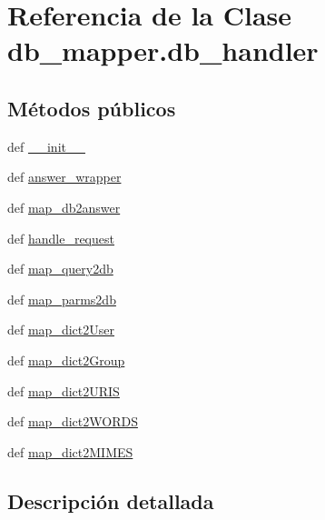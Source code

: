 \hypertarget{classdb__mapper_1_1db__handler}{\section{Referencia de la Clase db\-\_\-mapper.\-db\-\_\-handler}
\label{classdb__mapper_1_1db__handler}
}
\subsection*{Métodos públicos}
\begin{DoxyCompactItemize}
\item 
def \hyperlink{classdb__mapper_1_1db__handler_a479a5e4baa7d3a4a0c086b5f20b19886}{\-\_\-\-\_\-init\-\_\-\-\_\-}
\item 
def \hyperlink{classdb__mapper_1_1db__handler_a5fcc6f04805b1668cfdd37a56b96e481}{answer\-\_\-wrapper}
\item 
def \hyperlink{classdb__mapper_1_1db__handler_a4d3b0376c65e8fafd85e7ebd66c9b268}{map\-\_\-db2answer}
\item 
def \hyperlink{classdb__mapper_1_1db__handler_adebfe1a956d4058883ce07bdaf253365}{handle\-\_\-request}
\item 
def \hyperlink{classdb__mapper_1_1db__handler_acab02d962db6d8b42cdeae79bf46425d}{map\-\_\-query2db}
\item 
def \hyperlink{classdb__mapper_1_1db__handler_ab82596ecdbec3136052c2f63ea282f0c}{map\-\_\-parms2db}
\item 
def \hyperlink{classdb__mapper_1_1db__handler_aadb435084c4d5fccc96513605042b49b}{map\-\_\-dict2\-User}
\item 
def \hyperlink{classdb__mapper_1_1db__handler_aa0a226e11a8afd0b8dfa20fd76362832}{map\-\_\-dict2\-Group}
\item 
def \hyperlink{classdb__mapper_1_1db__handler_a7f56361e908c36b3b9a89679276b70c9}{map\-\_\-dict2\-U\-R\-I\-S}
\item 
def \hyperlink{classdb__mapper_1_1db__handler_a622709833c8db8cf253628fb6e599f17}{map\-\_\-dict2\-W\-O\-R\-D\-S}
\item 
def \hyperlink{classdb__mapper_1_1db__handler_a911bd297d667fd50426a75ad13ab8779}{map\-\_\-dict2\-M\-I\-M\-E\-S}
\end{DoxyCompactItemize}


\subsection{Descripción detallada}


